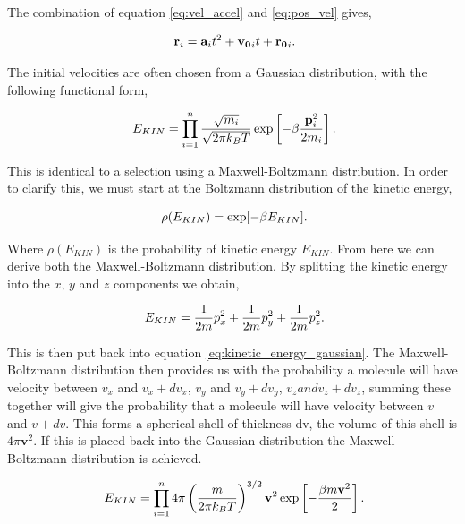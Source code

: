The combination of equation \ref{eq:vel_accel} and \ref{eq:pos_vel} gives,

\begin{equation} \label{eq:euler}
\ \mathbf{r}_i = \mathbf{a}_i t^2 + \mathbf{v_0}_i t + \mathbf{r_0}_i \\.
\end{equation}

The initial velocities are often chosen from a Gaussian distribution, with the following functional form,

\begin{equation} \label{eq:kinetic_energy_gaussian}
\ E_{KIN} = \prod_{i=1}^{n} \frac{\sqrt{m_i}}{\sqrt{2\pi k_B T}} \exp \left[ - \beta \frac{\mathbf{p}^2_{i}}{2m_i}  \right] \\.
\end{equation}

This is identical to a selection using a Maxwell-Boltzmann distribution.  In order to clarify this, we must start at the Boltzmann distribution of the kinetic energy,

\begin{equation}
\ \rho(E_{KIN}) = \exp [ -\beta E_{KIN} ] \\.
\end{equation}

Where $\rho(E_{KIN})$ is the probability of kinetic energy $E_{KIN}$.  From here we can derive both the Maxwell-Boltzmann distribution.  By splitting the kinetic energy into the $x$, $y$ and $z$ components we obtain,

\begin{equation}
\ E_{KIN} = \frac{1}{2m}p_{x}^2 + \frac{1}{2m}p_{y}^2 + \frac{1}{2m}p_{z}^2 \\.
\end{equation}

 This is then put back into equation \ref{eq:kinetic_energy_gaussian}.  The Maxwell-Boltzmann distribution then provides us with the probability a molecule will have velocity between $v_x$ and $v_x + dv_x$, $v_y$ and $v_y + dv_y$, $v_z and v_z + dv_z$, summing these together will give the probability that a molecule will have velocity between $v$ and $v+dv$.  This forms a spherical shell of thickness dv, the volume of this shell is $4\pi \mathbf{v}^2$.  If this is placed back into the Gaussian distribution the Maxwell-Boltzmann distribution is achieved.
 
\begin{equation}
 \ E_{KIN} = \prod_{i=1}^{n} 4\pi \left( \frac{m}{2\pi k_B T} \right)^{3/2} \mathbf{v}^2 \exp \left[ - \frac{\beta m \mathbf{v}^2}{2}  \right] \\.
\end{equation}

